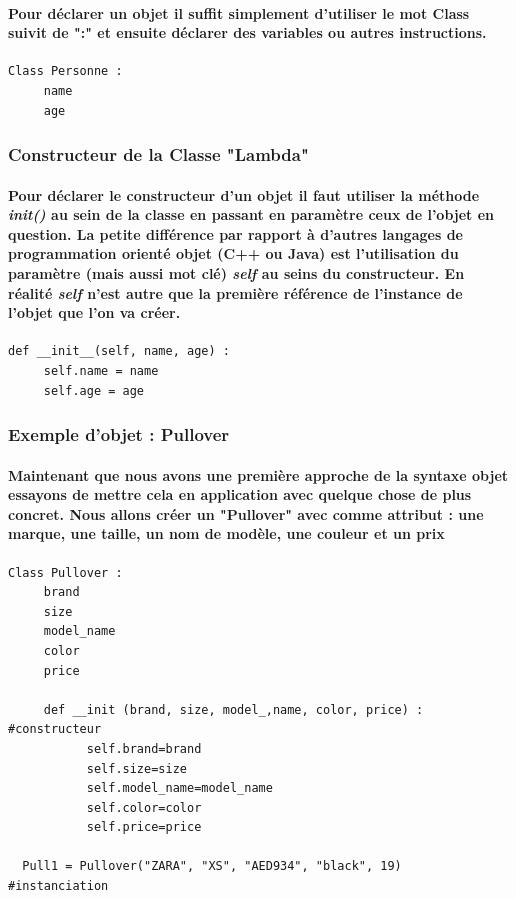 \documentclass[a4paper, 12pt, twoside]{article}
\begin{document}
\paragraph{Pour déclarer un objet il suffit simplement d'utiliser le mot Class suivit de ":" et ensuite déclarer des variables ou autres instructions.}
\begin{verbatim}
Class Personne : 
     name
     age
\end{verbatim}
\subsubsection{Constructeur de la Classe "Lambda"}
\paragraph{Pour déclarer le constructeur d'un objet il faut utiliser la méthode \textit{init()} au sein de la classe en passant en paramètre ceux de l'objet en question. La petite différence par rapport à d'autres langages de programmation orienté objet (C++ ou Java) est l'utilisation du paramètre (mais aussi mot clé) \textit{self} au seins du constructeur. En réalité \textit{self} n'est autre que la première référence de l'instance de l'objet que l'on va créer. } 
\begin{verbatim}
def __init__(self, name, age) :
     self.name = name
     self.age = age
\end{verbatim}
\subsubsection{Exemple d'objet : Pullover}
\paragraph{Maintenant que nous avons une première approche de la syntaxe objet essayons de mettre cela en application avec quelque chose de plus concret. Nous allons créer un "Pullover" avec comme attribut : une marque, une taille, un nom de modèle, une couleur et un prix }
\begin{verbatim}
Class Pullover : 
     brand
     size
     model_name
     color
     price
   
     def __init (brand, size, model_,name, color, price) :       #constructeur
           self.brand=brand
           self.size=size
           self.model_name=model_name
           self.color=color
           self.price=price
          
  Pull1 = Pullover("ZARA", "XS", "AED934", "black", 19)         #instanciation
  
          
\end{verbatim}
\newpage
\end{document}
